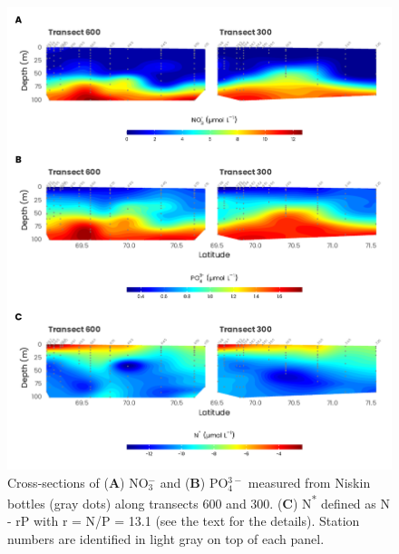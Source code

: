 \documentclass[essd, manuscript]{copernicus}
\begin{document}
\begin{figure}[H]
    \centering
    \includegraphics[scale = 0.85]{../../../graphs/fig07.pdf}
    \caption{Cross-sections of (\textbf{A}) NO$_3^-$ and (\textbf{B}) PO$_4^{3-}$ measured from Niskin bottles (gray dots) along transects 600 and 300. (\textbf{C}) N\textsuperscript{*} defined as N - rP with r = N/P = 13.1 (see the text for the details). Station numbers are identified in light gray on top of each panel.}
\end{figure}

\clearpage
\end{document}
